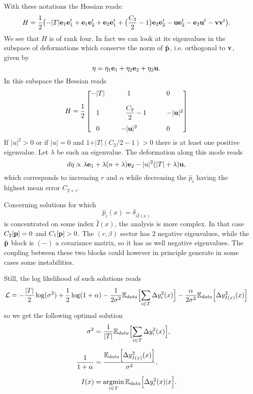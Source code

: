 With these notations the Hessian reads: 
\[
H = \frac{1}{2}\bigl(-\vert T\vert{\bf e}_1{\bf e}_1^t+{\bf e}_1{\bf e}_2^t+{\bf e}_2{\bf e}_1^t+\bigl(\frac{C_2}{2}-1\bigr){\bf e}_2{\bf e}_2^t
-{\bf u}{\bf e}_2^t-{\bf e}_2{\bf u}^t-{\bf v}{\bf v}^t\bigr).
\]
We see that $H$ is of rank four. In fact we can look at its eigenvalues in the subspace of deformations
which conserve the norm of $\hat {\bf p}$, i.e. orthogonal to ${\bf v}$, given by
\[
{\bf \eta} = \eta_1{\bf e}_1+\eta_2{\bf e}_2+\eta_3{\bf u}.
\]
In this subspace the Hessian reads
\[
H =\frac{1}{2}
\left[
  \begin{matrix}
 -\vert T\vert& 1 &0 \\[0.4cm] 
 1 & \qquad\displaystyle \frac{C_2}{2}-1&\qquad-\vert {\bf u}\vert^2  \\[0.4cm]
 0& -\vert {\bf u}\vert^2 &0 
  \end{matrix}
  \right]
\]
If $|u|^2>0$ or  if $|u|=0$ and $1+\vert T\vert(C_2/2-1)>0$ there is at least one positive eigenvalue. Let $\lambda$ be such an eigenvalue.
The deformation along this mode reads
\[
{d\bf \eta} \propto \lambda{\bf e}_1+\lambda(n+\lambda){\bf e}_2-|u|^2(\vert T\vert+\lambda){\bf u},
\]
which corresponds to increasing $r$ and $\alpha$ while decreasing the $\hat p_i$ having the highest mean error $C_{2+i}$.


\noindent Concerning solutions for which
\[
\hat p_i(x) = \delta_{i\hat I(x)}
\]
is concentrated on some index $\hat I(x)$,  the analysis is more complex. In that case $C_2[{\bf p}]=0$ and $C_1[{\bf p}] >0$. The $(r,\beta)$ sector has $2$ negative eigenvalues,
while the $\hat {\bf p}$ block is $(-)$ a covariance matrix, so it has as well negative eigenvalues. The coupling between these  two blocks could however in principle generate in some cases some instabilities.

Still, the log likelihood of such solutions reads
\[
{\cal L} = -\frac{\vert T\vert}{2}\log(\sigma^2)+\frac{1}{2}\log(1+\alpha)-\frac{1}{2\sigma^2}{\mathbb E}_{data}\Bigl[\sum_{i\in T}\Delta y_i^2(x)\Bigr]-\frac{\alpha}{2\sigma^2}{\mathbb E}_{data}\Bigl[\Delta y_{I(x)}^2(x)\Bigr]
\]
so we get the following optimal solution
\begin{align*}
\sigma^2 &= \frac{1}{\vert T\vert}{\mathbb E}_{data}\Bigl[\sum_{i\in T}\Delta y_i^2(x)\Bigr],\\[0.2cm]
\frac{1}{1+\alpha} &=  \frac{{\mathbb E}_{data}\Bigl[\Delta y_{I(x)}^2(x)\Bigr]}{\sigma^2},\\[0.2cm]
I(x) &= \operatorname*{argmin}_{i\in T} {\mathbb E}_{data}\Bigl[\Delta y_i^2(x)\vert x \Bigr].
\end{align*}
